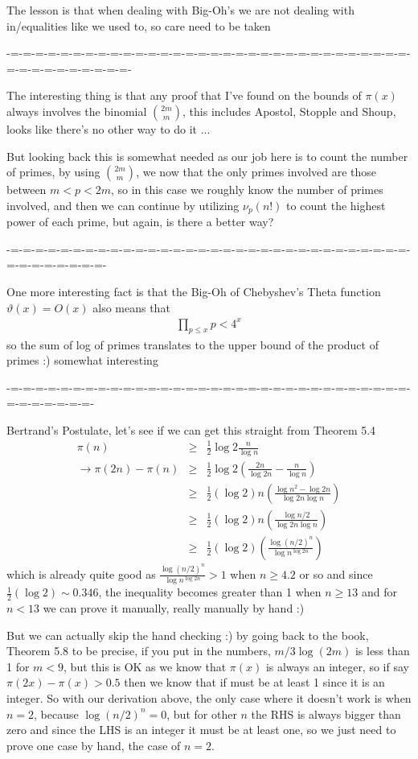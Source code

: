\documentclass[aps,preprint,preprintnumbers,nofootinbib,showpacs,prd]{revtex4-1}
\newcommand{\nbea}{\begin{eqnarray*}}
\newcommand{\neea}{\end{eqnarray*}}
\begin{document}
The lesson is that when dealing with Big-Oh's we are not dealing with in/equalities like we used to, so care need to be taken

-=-=-=-=-=-=-=-=-=-=-=-=-=-=-=-=-=-=-=-=-=-=-=-=-=-=-=-=-=-=-=-=-=-=-=-=-=-=-=-=-=-=-

The interesting thing is that any proof that I've found on the bounds of $\pi(x)$ always involves the binomial $\binom{2m}{ m}$, this includes Apostol, Stopple and Shoup, looks like there's no other way to do it ...

But looking back this is somewhat needed as our job here is to count the number of primes, by using $\binom{2m}{m}$, we now that the only primes involved are those between $m < p < 2m$, so in this case we roughly know the number of primes involved, and then we can continue by utilizing $\nu_p(n!)$ to count the highest power of each prime, but again, is there a better way?

-=-=-=-=-=-=-=-=-=-=-=-=-=-=-=-=-=-=-=-=-=-=-=-=-=-=-=-=-=-=-=-=-=-=-=-=-=-=-=-=-

One more interesting fact is that the Big-Oh of Chebyshev's Theta function $\vartheta(x) = O(x)$ also means that 
%
\nbea
\prod_{p \le x} p < 4^x
\neea
%
so the sum of log of primes translates to the upper bound of the product of primes :) somewhat interesting

-=-=-=-=-=-=-=-=-=-=-=-=-=-=-=-=-=-=-=-=-=-=-=-=-=-=-=-=-=-=-=-=-=-=-=-=-=-=-=-

Bertrand's Postulate, let's see if we can get this straight from Theorem 5.4
%
\nbea
\pi(n) & \ge & \frac{1}{2}\log 2 \frac{n}{\log n} \\
\to \pi(2n) - \pi(n) & \ge & \frac{1}{2}\log 2 \left (\frac{2n}{\log 2n} - \frac{n}{\log n} \right ) \\
& \ge & \frac{1}{2}(\log 2) n \left (\frac{\log n^2 - \log 2n}{\log 2n \log n} \right ) \\
& \ge & \frac{1}{2}(\log 2) n \left (\frac{\log n/2}{\log 2n \log n} \right ) \\
& \ge & \frac{1}{2}(\log 2) \left (\frac{\log (n/2)^n}{ \log n^{\log 2n}} \right ) 
\neea
%
which is already quite good as $\frac{\log (n/2)^n}{ \log n^{\log 2n}} > 1$ when $n \ge 4.2$ or so and since $\frac{1}{2}(\log 2) \sim 0.346$, the inequality becomes greater than 1 when $n \ge 13$ and for $n < 13$ we can prove it manually, really manually by hand :)

But we can actually skip the hand checking :) by going back to the book, Theorem 5.8 to be precise, if you put in the numbers, $m/3\log(2m)$ is less than 1 for $m < 9$, but this is OK as we know that $\pi(x)$ is always an integer, so if say $\pi(2x) - \pi(x) > 0.5$ then we know that if must be at least 1 since it is an integer. So with our derivation above, the only case where it doesn't work is when $n=2$, because $\log (n/2)^n = 0$, but for other $n$ the RHS is always bigger than zero and since the LHS is an integer it must be at least one, so we just need to prove one case by hand, the case of $n=2$.
\end{document}
